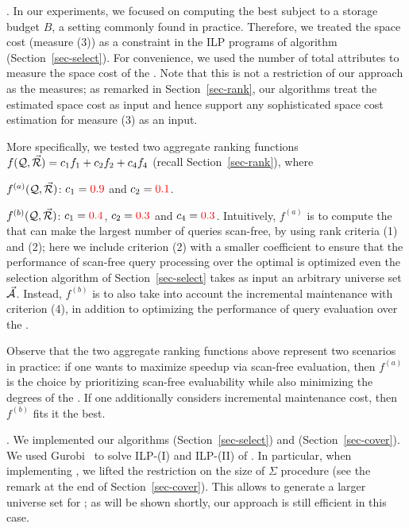 .
In our experiments, we focused on computing the best \bdss subject to a
storage budget $B$, a setting commonly found in practice.
Therefore, we treated the space cost (\ie measure (3)) as a
constraint in the ILP programs of algorithm \opts
(Section~\ref{sec-select}). For convenience, we used the
number of total attributes to measure the space cost of the
\bdss. Note that this is not a restriction of our approach as the
measures; as remarked in Section~\ref{sec-rank}, our
algorithms treat the estimated space cost as input
and hence support any sophisticated space cost estimation
for measure (3) as an input.


\vspace{0.4ex}
More specifically, we tested two aggregate ranking functions $f(\mathcal Q, \vec{{\mathcal R}}) = c_{1}f_{1} +
c_{2}f_{2} + c_{4}f_{4}$ (recall
Section~\ref{sec-rank}), where 

\vspace{0.6ex}
\bi
\item[(a)] $f^{(a)}(\mathcal Q, \vec{{\mathcal R}})$: $c_{1} = {\color{red}{0.9}}$ and $c_{2} = {\color{red}{0.1}}$. 
\item[(b)] $f^{(b)}(\mathcal Q, \vec{{\mathcal R}})$: $c_{1} = {\color{red}{0.4}}$, $c_{2} =
  {\color{red}{0.3}}$ and $c_{4} = {\color{red}{0.3}}$.
\ei
Intuitively, $f^{(a)}$ is to compute the \bdss that can make the
largest number of queries scan-free, by using rank criteria (1) and (2);
here we include criterion (2) with a smaller coefficient to ensure
that the performance of scan-free query processing over the optimal
\bdss is optimized even the selection algorithm \opts of
Section~\ref{sec-select} takes as input an arbitrary %
universe set $\vec{{\mathcal A}}$.
Instead, $f^{(b)}$ is to
also take into account the incremental maintenance 
with criterion (4), in addition to optimizing the
performance of query evaluation over the \bdss. 




\vspace{0.6ex}
Observe that the two aggregate ranking functions above represent two
scenarios in practice: if one wants to maximize speedup via
scan-free evaluation, then $f^{(a)}$ is the choice by prioritizing
scan-free evaluability while also minimizing the degrees of the \bdss.
If one additionally considers incremental maintenance cost,
then $f^{(b)}$ fits it the best.



. We implemented our algorithms \opts
(Section~\ref{sec-select}) and \usc (Section~\ref{sec-cover}). We
used Gurobi~\cite{gurobi} to solve ILP-(I) and ILP-(II) of \opts.
In particular, when implementing \usc, we lifted the restriction
on the size of $\Sigma$  procedure \decompose (see the remark
at the end of Section~\ref{sec-cover}). This allows \usc to
generate a larger universe set for \opts; as will be shown
shortly, our approach is still efficient in this case.

